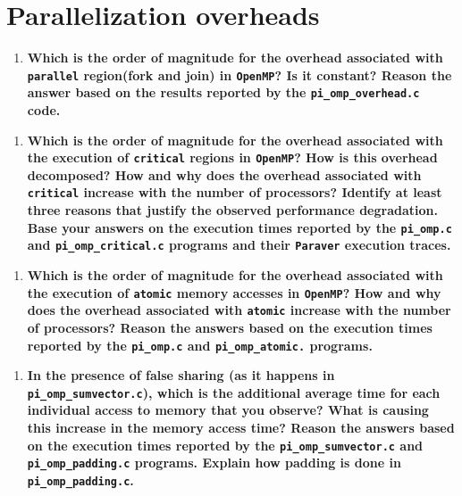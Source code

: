 \documentclass[a4paper]{article}
\begin{document}
\section{Parallelization overheads}

\begin{enumerate}
	\item \textbf{Which is the order of magnitude for the overhead associated with \texttt{parallel} region(fork and join) in \texttt{OpenMP}? Is it constant? Reason the answer based on the results reported by the \texttt{pi\_omp\_overhead.c} code.}
\end{enumerate}

\begin{enumerate}[resume]
	\item \textbf{Which is the order of magnitude for the overhead associated with the execution of \texttt{critical} regions in \texttt{OpenMP}? How is this overhead decomposed? How and why does the overhead associated with \texttt{critical} increase with the number of processors? Identify at least three reasons that justify the observed performance degradation. Base your answers on the execution times reported by the \texttt{pi\_omp.c} and \texttt{pi\_omp\_critical.c} programs and their \texttt{Paraver} execution traces.}
\end{enumerate}

\begin{enumerate}[resume]
	\item \textbf{Which is the order of magnitude for the overhead associated with the execution of \texttt{atomic} memory accesses in \texttt{OpenMP}? How and why does the overhead associated with \texttt{atomic} increase with the number of processors? Reason the answers based on the execution times reported by the \texttt{pi\_omp.c} and \texttt{pi\_omp\_atomic.} programs.}
\end{enumerate}

\begin{enumerate}[resume]
	\item \textbf{In the presence of false sharing (as it happens in \texttt{pi\_omp\_sumvector.c}), which is the additional average time for each individual access to memory that you observe? What is causing this increase in the memory access time? Reason the answers based on the execution times reported by the \texttt{pi\_omp\_sumvector.c} and \texttt{pi\_omp\_padding.c} programs. Explain how padding is done in \texttt{pi\_omp\_padding.c}.}
\end{enumerate}
\end{document}

